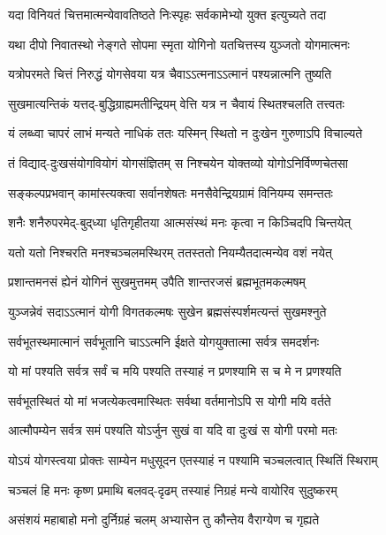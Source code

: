 \twolineshloka
{यदा विनियतं चित्तमात्मन्येवावतिष्ठते}
{निःस्पृहः सर्वकामेभ्यो युक्त इत्युच्यते तदा}%

\twolineshloka
{यथा दीपो निवातस्थो नेङ्गते सोपमा स्मृता}
{योगिनो यतचित्तस्य युञ्जतो योगमात्मनः}%

\twolineshloka
{यत्रोपरमते चित्तं निरुद्धं योगसेवया}
{यत्र चैवाऽऽत्मनाऽऽत्मानं पश्यन्नात्मनि तुष्यति}%

\twolineshloka
{सुखमात्यन्तिकं यत्तद्-बुद्धिग्राह्यमतीन्द्रियम्}
{वेत्ति यत्र न चैवायं स्थितश्चलति तत्त्वतः}%

\twolineshloka
{यं लब्ध्वा चापरं लाभं मन्यते नाधिकं ततः}
{यस्मिन् स्थितो न दुःखेन गुरुणाऽपि विचाल्यते}%

\twolineshloka
{तं विद्याद्-दुःखसंयोगवियोगं योगसंज्ञितम्}
{स निश्चयेन योक्तव्यो योगोऽनिर्विण्णचेतसा}%

\twolineshloka
{सङ्कल्पप्रभवान् कामांस्त्यक्त्वा सर्वानशेषतः}
{मनसैवेन्द्रियग्रामं विनियम्य समन्ततः}%

\twolineshloka
{शनैः शनैरुपरमेद्-बुद्‌ध्या धृतिगृहीतया}
{आत्मसंस्थं मनः कृत्वा न किञ्चिदपि चिन्तयेत्}%

\twolineshloka
{यतो यतो निश्चरति मनश्चञ्चलमस्थिरम्}
{ततस्ततो नियम्यैतदात्मन्येव वशं नयेत्}%

\twolineshloka
{प्रशान्तमनसं ह्येनं योगिनं सुखमुत्तमम्}
{उपैति शान्तरजसं ब्रह्मभूतमकल्मषम्}%

\twolineshloka
{युञ्जन्नेवं सदाऽऽत्मानं योगी विगतकल्मषः}
{सुखेन ब्रह्मसंस्पर्शमत्यन्तं सुखमश्नुते}%

\twolineshloka
{सर्वभूतस्थमात्मानं सर्वभूतानि चाऽऽत्मनि}
{ईक्षते योगयुक्तात्मा सर्वत्र समदर्शनः}%

\twolineshloka
{यो मां पश्यति सर्वत्र सर्वं च मयि पश्यति}
{तस्याहं न प्रणश्यामि स च मे न प्रणश्यति}%

\twolineshloka
{सर्वभूतस्थितं यो मां भजत्येकत्वमास्थितः}
{सर्वथा वर्तमानोऽपि स योगी मयि वर्तते}%

\twolineshloka
{आत्मौपम्येन सर्वत्र समं पश्यति योऽर्जुन}
{सुखं वा यदि वा दुःखं स योगी परमो मतः}%

\twolineshloka
{योऽयं योगस्त्वया प्रोक्तः साम्येन मधुसूदन}
{एतस्याहं न पश्यामि चञ्चलत्वात् स्थितिं स्थिराम्}%

\twolineshloka
{चञ्चलं हि मनः कृष्ण प्रमाथि बलवद्-दृढम्}
{तस्याहं निग्रहं मन्ये वायोरिव सुदुष्करम्}%

\twolineshloka
{असंशयं महाबाहो मनो दुर्निग्रहं चलम्}
{अभ्यासेन तु कौन्तेय वैराग्येण च गृह्यते}%

